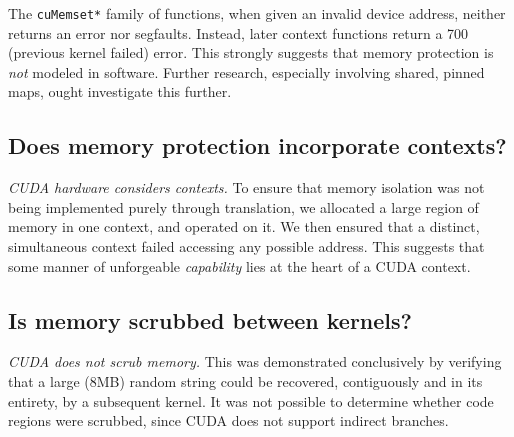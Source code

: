 \documentclass[letterpaper,10pt]{article}
\begin{document}
\begin{multicols}{2}
The \texttt{cuMemset*} family of functions, when given an invalid device address,
neither returns an error nor segfaults. Instead, later context functions return
a 700 (previous kernel failed) error. This strongly suggests that memory
protection is \textit{not} modeled in software. Further research, especially
involving shared, pinned maps, ought investigate this further.
\subsection{Does memory protection incorporate contexts?}
\textit{CUDA hardware considers contexts.} To ensure that memory isolation
was not being implemented purely through translation, we allocated a large
region of memory in one context, and operated on it. We then ensured that a
distinct, simultaneous context failed accessing any possible address. This
suggests that some manner of unforgeable \textit{capability}\cite{capability}
lies at the heart of a CUDA context.
\subsection{Is memory scrubbed between kernels?}
\textit{CUDA does not scrub memory.} This was demonstrated conclusively by
verifying that a large (8MB) random string could be recovered, contiguously and
in its entirety, by a subsequent kernel. It was not possible to determine
whether code regions were scrubbed, since CUDA does not support indirect
branches.

\end{multicols}
\end{document}
